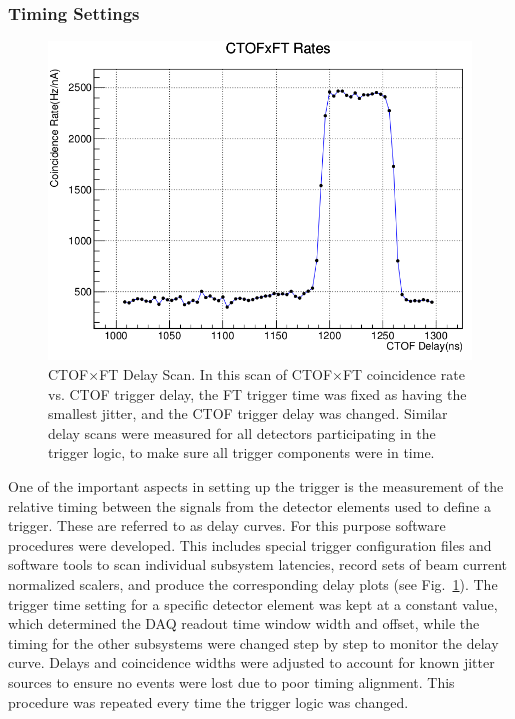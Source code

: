 \subsubsection{Timing Settings}

\begin{figure}[hbt]
	\centering
	\includegraphics[width=1.0\columnwidth,keepaspectratio]{img/delay_scan_ctof_ft.png}
	\caption{CTOF$\times$FT Delay Scan. In this scan of CTOF$\times$FT coincidence rate vs. CTOF
          trigger delay, the FT trigger time was fixed as having the smallest jitter, and the CTOF trigger delay
          was changed. Similar delay scans were measured for all detectors participating in the trigger logic, to
          make sure all trigger components were in time.}
	\label{fig:delay_scan_ctof_ft}
\end{figure}

One of the important aspects in setting up the trigger is the measurement of the relative timing between the
signals from the detector elements used to define a trigger. These are referred to as delay curves. For this
purpose software procedures were developed. This includes special trigger configuration files and software
tools to scan individual subsystem latencies, record sets of beam current normalized scalers, and produce the
corresponding delay plots (see Fig.~\ref{fig:delay_scan_ctof_ft}). The trigger time setting for a specific
detector element was kept at a constant value, which determined the DAQ readout time window width and
offset, while the timing for the other subsystems were changed step by step to monitor the delay curve. Delays
and coincidence widths were adjusted to account for known jitter sources to ensure no events were lost due to
poor timing alignment. This procedure was repeated every time the trigger logic was changed.

